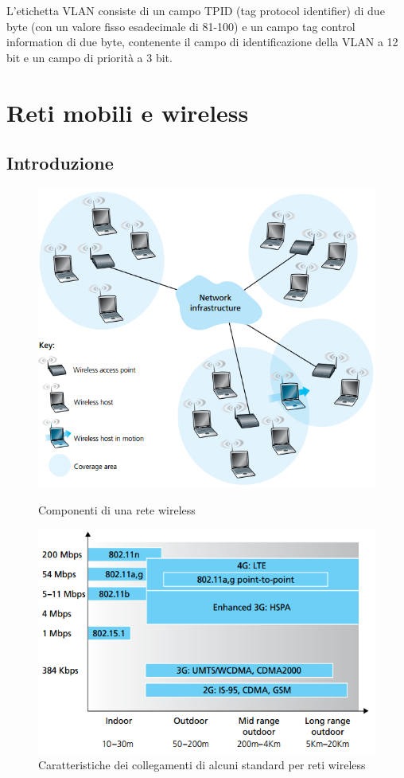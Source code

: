 \documentclass[11pt,a4paper]{book}
\begin{document}
L'etichetta VLAN consiste di un campo TPID (tag protocol identifier) di due byte (con un valore fisso esadecimale di 81-100) e un campo tag control information di due byte, contenente il campo di identificazione della VLAN a 12 bit e un campo di priorità a 3 bit.

\chapter{Reti mobili e wireless}
\section{Introduzione}
\begin{figure}
	\includegraphics[scale=0.6]{img/091.png}
	\caption{Componenti di una rete wireless}
	\label{fig: 091}
	\includegraphics[scale=0.6]{img/092.png}
	\caption{Caratteristiche dei collegamenti di alcuni standard per reti wireless}
	\label{fig: 092}
\end{figure}
\end{document}
